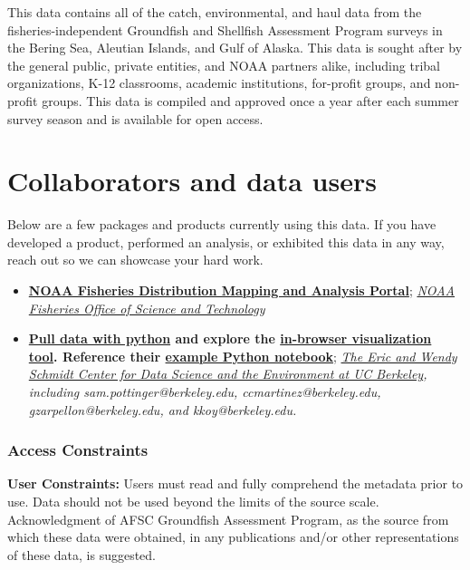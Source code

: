 \documentclass[
  letterpaper,
  oneside,
  open=any]{scrbook}
\begin{document}
This data contains all of the catch, environmental, and haul data from
the fisheries-independent Groundfish and Shellfish Assessment Program
surveys in the Bering Sea, Aleutian Islands, and Gulf of Alaska. This
data is sought after by the general public, private entities, and NOAA
partners alike, including tribal organizations, K-12 classrooms,
academic institutions, for-profit groups, and non-profit groups. This
data is compiled and approved once a year after each summer survey
season and is available for open access.

\part{Collaborators and data users}

Below are a few packages and products currently using this data. If you
have developed a product, performed an analysis, or exhibited this data
in any way, reach out so we can showcase your hard work.

\begin{itemize}
\item
  \textbf{\href{https://apps-st.fisheries.noaa.gov/dismap}{NOAA
  Fisheries Distribution Mapping and Analysis Portal}};
  \emph{\href{https://www.fisheries.noaa.gov/contact/office-science-and-technology}{NOAA
  Fisheries Office of Science and Technology}}
\item
  \textbf{\href{https://pyafscgap.org/}{Pull data with python} and
  explore the \href{https://app.pyafscgap.org/'}{in-browser
  visualization tool}. Reference their
  \href{https://mybinder.org/v2/gh/SchmidtDSE/afscgap/main?urlpath=/tree/index.ipynb}{example
  Python notebook}}; \emph{\href{https://dse.berkeley.edu/}{The Eric and
  Wendy Schmidt Center for Data Science and the Environment at UC
  Berkeley}, including sam.pottinger@berkeley.edu,
  ccmartinez@berkeley.edu, gzarpellon@berkeley.edu, and
  kkoy@berkeley.edu.}
\end{itemize}

\section*{Access Constraints}\label{access-constraints-1}


\textbf{User Constraints:} Users must read and fully comprehend the
metadata prior to use. Data should not be used beyond the limits of the
source scale. Acknowledgment of AFSC Groundfish Assessment Program, as
the source from which these data were obtained, in any publications
and/or other representations of these data, is suggested.
\end{document}
